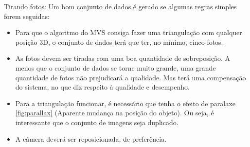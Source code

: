 Tirando fotos: Um bom conjunto de dados é gerado se algumas regras simples forem seguidas:

\begin{itemize}

\item{Para que o algoritmo do MVS consiga fazer uma triangulação com qualquer posição 3D, o conjunto de dados terá que ter, no mínimo, cinco fotos.}

\item{As fotos devem ser tiradas com uma boa quantidade de sobreposição. A menos que o conjunto de dados se torne muito grande, uma grande quantidade de fotos não prejudicará a qualidade. 
Mas terá uma compensação do sistema, no que diz respeito à qualidade e desempenho.}

\item{Para a triangulação funcionar, é necessário que tenha o efeito de paralaxe \ref{fig:parallax} (Aparente mudança na posição do objeto). Ou seja, é interessante que o conjunto de imagens seja duplicado.}

\item{A câmera deverá ser reposicionada, de preferência.}

\end{itemize}



